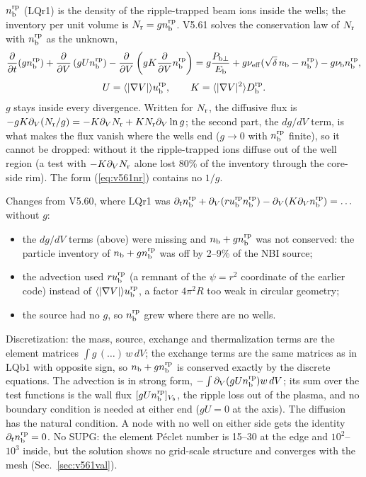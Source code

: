 \documentclass[11pt]{article}
\def\r#1{{\rm#1}}
\def\aves#1{\langle#1\rangle}
\def\ddV{\frac{\partial}{\partial V}}
\def\ddt{\frac{\partial}{\partial t}}
\def\nb{n_\r{b}}
\def\nbrp{n_\r{b}^\r{rp}}
\def\ubrp{u_\r{b}^\r{rp}}
\def\Dbrp{D_\r{b}^\r{rp}}
\def\Pbperp{P_{\r{b}\perp}}
\def\Eb{E_\r{b}}
\def\nueff{\nu_\r{eff}}
\def\nub{\nu_\r{b}}
\begin{document}
$\nbrp$ (LQr1) is the density of the ripple-trapped beam ions inside the wells;
the inventory per unit volume is $N_\r{r} = g\nbrp$.  V5.61 solves the
conservation law of $N_\r{r}$ with $\nbrp$ as the unknown,
\begin{equation}
  \ddt(g\nbrp) + \ddV\left(g U \nbrp\right) - \ddV\left(g K \ddV\nbrp\right)
  = g\frac{\Pbperp}{\Eb} + g\nueff(\sqrt\delta\,\nb - \nbrp) - g\nub\nbrp ,
  \label{eq:v561nr}
\end{equation}
\begin{equation}
  U = \aves{|\nabla V|}\ubrp, \qquad K = \aves{|\nabla V|^2}\Dbrp .
\end{equation}
$g$ stays inside every divergence.  Written for $N_\r{r}$, the diffusive flux is
$-gK\partial_V(N_\r{r}/g) = -K\partial_V N_\r{r} + K N_\r{r}\partial_V\ln g$; the
second part, the $dg/dV$ term, is what makes the flux vanish where the wells end
($g\to0$ with $\nbrp$ finite), so it cannot be dropped: without it the
ripple-trapped ions diffuse out of the well region (a test with
$-K\partial_V N_\r{r}$ alone lost 80\% of the inventory through the core-side rim).
The form (\ref{eq:v561nr}) contains no $1/g$.

Changes from V5.60, where LQr1 was $\partial_t\nbrp + \partial_V(r\ubrp\nbrp) - \partial_V(K\partial_V\nbrp) = \ldots$
without $g$:
\begin{itemize}
\item the $dg/dV$ terms (above) were missing and $\nb + g\nbrp$ was not conserved:
  the particle inventory of $\nb + g\nbrp$ was off by 2--9\% of the NBI source;
\item the advection used $r\ubrp$ (a remnant of the $\psi = r^2$ coordinate of the
  earlier code) instead of $\aves{|\nabla V|}\ubrp$, a factor $4\pi^2R$ too weak in
  circular geometry;
\item the source had no $g$, so $\nbrp$ grew where there are no wells.
\end{itemize}
Discretization: the mass, source, exchange and thermalization terms are the
element matrices $\int g\,(\ldots)\,w\,dV$; the exchange terms are the same matrices
as in LQb1 with opposite sign, so $\nb + g\nbrp$ is conserved exactly by the
discrete equations.  The advection is in strong form, $-\int\partial_V(gU\nbrp)w\,dV$;
its sum over the test functions is the wall flux $[gU\nbrp]_{V_b}$, the ripple loss
out of the plasma, and no boundary condition is needed at either end ($gU = 0$ at
the axis).  The diffusion has the natural condition.  A node with no well on
either side gets the identity $\partial_t\nbrp = 0$.  No SUPG: the element P\'eclet
number is 15--30 at the edge and $10^2$--$10^3$ inside, but the solution shows no
grid-scale structure and converges with the mesh (Sec.~\ref{sec:v561val}).
\end{document}
